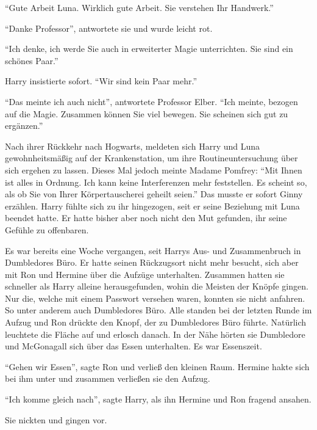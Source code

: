 \enquote{Gute Arbeit Luna. Wirklich gute Arbeit. Sie verstehen Ihr Handwerk.}

\enquote{Danke Professor}, antwortete sie und wurde leicht rot.

\enquote{Ich denke, ich werde Sie auch in erweiterter Magie unterrichten. Sie sind ein schönes Paar.}

Harry insistierte sofort. \enquote{Wir sind kein Paar mehr.}

\enquote{Das meinte ich auch nicht}, antwortete Professor Elber. \enquote{Ich meinte, bezogen auf die Magie. Zusammen können Sie viel bewegen. Sie scheinen sich gut zu ergänzen.}

Nach ihrer Rückkehr nach Hogwarts, meldeten sich Harry und Luna gewohnheitsmäßig auf der Krankenstation, um ihre Routineuntersuchung über sich ergehen zu lassen. Dieses Mal jedoch meinte Madame Pomfrey: \enquote{Mit Ihnen ist alles in Ordnung. Ich kann keine Interferenzen mehr feststellen. Es scheint so, als ob Sie von Ihrer Körpertauscherei geheilt seien.} Das musste er sofort Ginny erzählen. Harry fühlte sich zu ihr hingezogen, seit er seine Beziehung mit Luna beendet hatte. Er hatte bisher aber noch nicht den Mut gefunden, ihr seine Gefühle zu offenbaren.

\trenn

Es war bereits eine Woche vergangen, seit Harrys Aus- und Zusammenbruch in Dumbledores Büro. Er hatte seinen Rückzugsort nicht mehr besucht, sich aber mit Ron und Hermine über die Aufzüge unterhalten. Zusammen hatten sie schneller als Harry alleine herausgefunden, wohin die Meisten der Knöpfe gingen. Nur die, welche mit einem Passwort versehen waren, konnten sie nicht anfahren. So unter anderem auch Dumbledores Büro. Alle standen bei der letzten Runde im Aufzug und Ron drückte den Knopf, der zu Dumbledores Büro führte. Natürlich leuchtete die Fläche auf und erlosch danach. In der Nähe hörten sie Dumbledore und McGonagall sich über das Essen unterhalten. Es war Essenszeit.

\enquote{Gehen wir Essen}, sagte Ron und verließ den kleinen Raum. Hermine hakte sich bei ihm unter und zusammen verließen sie den Aufzug.

\enquote{Ich komme gleich nach}, sagte Harry, als ihn Hermine und Ron fragend ansahen.

Sie nickten und gingen vor.

